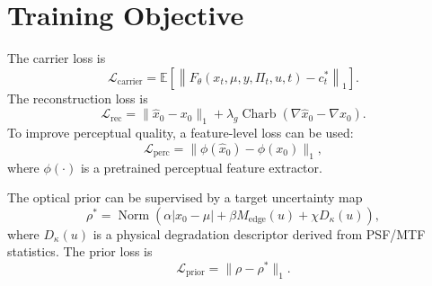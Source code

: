 \documentclass[journal]{IEEEtran}
\newcommand{\E}{\mathbb{E}}
\newcommand{\Norm}{\operatorname{Norm}}
\newcommand{\Charb}{\operatorname{Charb}}
\begin{document}
\section{Training Objective}
The carrier loss is
\begin{equation}
    \mathcal{L}_{\mathrm{carrier}}=\E\left[\left\|F_{\theta}(x_t,\mu,y,\Pi_t,u,t)-c_t^{*}\right\|_1\right].
    \label{eq:loss_carrier}
\end{equation}
The reconstruction loss is
\begin{equation}
    \mathcal{L}_{\mathrm{rec}}=\|\hat{x}_0-x_0\|_1+\lambda_g\Charb\left(\nabla\hat{x}_0-\nabla x_0\right).
    \label{eq:loss_rec}
\end{equation}
To improve perceptual quality, a feature-level loss can be used:
\begin{equation}
    \mathcal{L}_{\mathrm{perc}}=\|\phi(\hat{x}_0)-\phi(x_0)\|_1,
    \label{eq:loss_perc}
\end{equation}
where $\phi(\cdot)$ is a pretrained perceptual feature extractor.

The optical prior can be supervised by a target uncertainty map
\begin{equation}
    \rho^{*}=\Norm\left(\alpha|x_0-\mu|+\beta M_{\mathrm{edge}}(u)+\chi D_{\kappa}(u)\right),
    \label{eq:rho_target}
\end{equation}
where $D_{\kappa}(u)$ is a physical degradation descriptor derived from PSF/MTF statistics. The prior loss is
\begin{equation}
    \mathcal{L}_{\mathrm{prior}}=\|\rho-\rho^{*}\|_1.
    \label{eq:loss_prior}
\end{equation}
\end{document}
